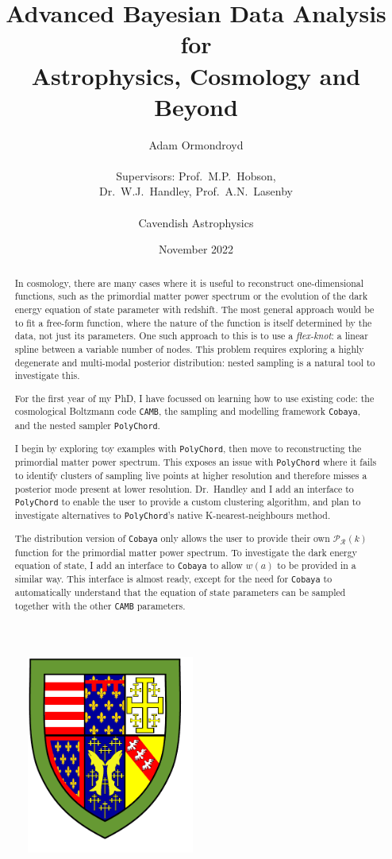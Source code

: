 \documentclass{article}
\title{Advanced Bayesian Data Analysis for \\ Astrophysics, Cosmology and Beyond}
\author{Adam Ormondroyd\\ \\Supervisors: Prof.~M.P.~Hobson, \\ Dr.~W.J.~Handley, Prof.~A.N.~Lasenby\\ \\Cavendish Astrophysics}
\date{November 2022}
\begin{document}
\setcounter{page}{0}
\maketitle

\begin{figure}[!h]
  \centering
  \includegraphics[width=5.5cm]{Queens'_shield.pdf}
  \label{fig:crest}
\end{figure}

\begin{abstract}

In cosmology, there are many cases where it is useful to reconstruct one-dimensional functions, such as the primordial matter power spectrum or the evolution of the dark energy equation of state parameter with redshift. The most general approach would be to fit a free-form function, where the nature of the function is itself determined by the data, not just its parameters. One such approach to this is to use a \textit{flex-knot}: a linear spline between a variable number of nodes. This problem requires exploring a highly degenerate and multi-modal posterior distribution: nested sampling is a natural tool to investigate this.

For the first year of my PhD, I have focussed on learning how to use existing code: the cosmological Boltzmann code \texttt{CAMB}, the sampling and modelling framework \texttt{Cobaya}, and the nested sampler \texttt{PolyChord}.

I begin by exploring toy examples with \texttt{PolyChord}, then move to reconstructing the primordial matter power spectrum. This exposes an issue with \texttt{PolyChord} where it fails to identify clusters of sampling live points at higher resolution and therefore misses a posterior mode present at lower resolution. Dr.~Handley and I add an interface to \texttt{PolyChord} to enable the user to provide a custom clustering algorithm, and plan to investigate alternatives to \texttt{PolyChord}'s native K-nearest-neighbours method.

The distribution version of \texttt{Cobaya} only allows the user to provide their own $\mathcal P_\mathcal R(k)$ function for the primordial matter power spectrum. To investigate the dark energy equation of state, I add an interface to \texttt{Cobaya} to allow $w(a)$ to be provided in a similar way. This interface is almost ready, except for the need for \texttt{Cobaya} to automatically understand that the equation of state parameters can be sampled together with the other \texttt{CAMB} parameters.
\end{abstract}
\end{document}
